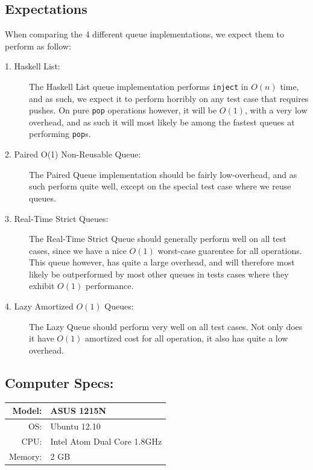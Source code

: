 \subsection{Expectations}
When comparing the 4 different queue implementations, we expect them to perform as follow:
\begin{description}

\item[1. Haskell List:]
The Haskell List queue implementation performs \texttt{inject} in $O(n)$ time, and as such, we expect it to perform horribly on any test case that requires pushes.
On pure \texttt{pop} operations however, it will be $O(1)$, with a very low overhead, and as such it will most likely be among the fastest queues at performing \texttt{pop}s.
\item[2. Paired O(1) Non-Reusable Queue:]
The Paired Queue implementation should be fairly low-overhead, and as such perform quite well, except on the special test case where we reuse queues.
\item[3. Real-Time Strict Queues:] 
The Real-Time Strict Queue should generally perform well on all test cases, since we have a nice $O(1)$ worst-case guarentee for all operations. This queue however, has quite a large overhead, and will therefore most likely be outperformed by most other queues in tests cases where they exhibit $O(1)$ performance. 
\item[4. Lazy Amortized $O(1)$ Queues:]
The Lazy Queue should perform very well on all test cases. Not only does it have $O(1)$ amortized cost for all operation, it also has quite a low overhead. 

\end{description}

\subsection{Computer Specs:}
\begin{tabular}{| r  l |} \hline
Model: &  ASUS 1215N \\ \hline
OS: & Ubuntu 12.10 \\ \hline
CPU: & Intel Atom Dual Core 1.8GHz\\ \hline
Memory: & 2 GB\\ \hline
\end{tabular}

